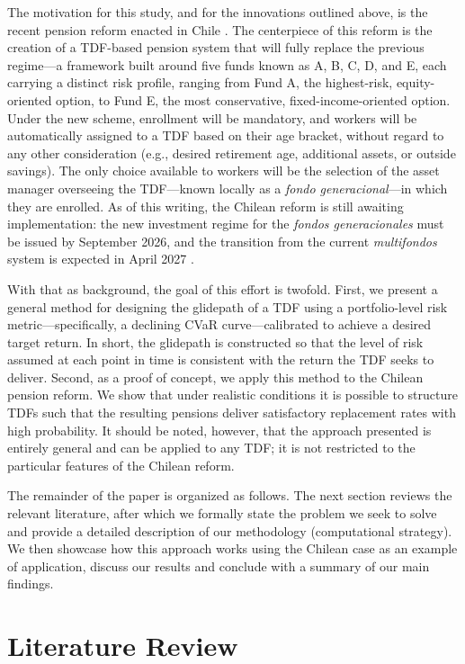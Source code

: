 \documentclass[11pt]{article}
\begin{document}
 The motivation for this study, and for the innovations outlined above, 
is the recent pension reform enacted in Chile \cite{ley21735}. The 
centerpiece of this reform is the creation of a TDF-based pension 
system that will fully replace the previous regime---a framework built 
around five funds known as A, B, C, D, and E, each carrying a distinct 
risk profile, ranging from Fund A, the highest-risk, equity-oriented 
option, to Fund E, the most conservative, fixed-income-oriented option. Under the new scheme, enrollment will be mandatory, and workers will be automatically assigned to a TDF based on their age bracket, without regard to any other consideration (e.g., desired retirement age, additional assets, or outside savings). The only choice available to workers will be the selection of the asset manager overseeing the TDF---known locally as a \emph{fondo generacional}---in which they are enrolled. As of this writing, the Chilean reform is still awaiting implementation: the new investment regime for the  \emph{fondos generacionales}  must be issued by September 2026, and the transition from the current \textit{multifondos} system is expected in April 2027 \cite{previsionsocial2025mercer}.

With that as background, the goal of this effort is twofold. First, we present a general method for designing the glidepath of a TDF using a portfolio-level risk metric---specifically, a declining CVaR curve---calibrated to achieve a desired target return. In short, the glidepath is constructed so that the level of risk assumed at each point in time is consistent with the return the TDF seeks to deliver. Second, as a proof of concept, we apply this method to the Chilean pension reform. We show that under realistic conditions it is possible to structure TDFs such that the resulting pensions deliver satisfactory replacement rates with high probability. It should be noted, however, that the approach presented is entirely general and can be applied to any TDF; it is not restricted to the particular features of the Chilean reform.

The remainder of the paper is organized as follows. The next section reviews the relevant literature, after which we formally state the problem we seek to solve and provide a detailed description of our methodology (computational strategy). We then showcase how this approach works using the Chilean case as an example of application, discuss our results and conclude with a summary of our main findings.

\section{Literature Review}
\end{document}
